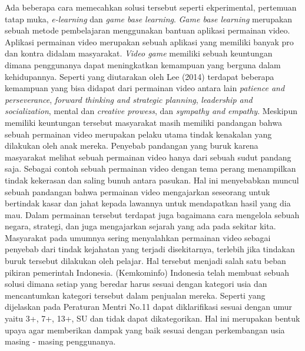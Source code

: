 \linebreak\linebreak
Ada beberapa cara memecahkan solusi tersebut seperti ekperimental, pertemuan tatap muka, \textit{e-learning} dan \textit{game base learning}. \textit{Game base learning} merupakan sebuah metode pembelajaran menggunakan bantuan aplikasi permainan video. Aplikasi permainan video merupakan sebuah aplikasi yang memiliki banyak pro dan kontra didalam masyarakat. \textit{Video game} memiliki sebuah keuntungan dimana penggunanya dapat meningkatkan kemampuan yang berguna dalam kehidupannya. Seperti yang diutarakan oleh Lee (2014) terdapat beberapa kemampuan yang bisa didapat dari permainan video antara lain \textit{patience and perseverance}, \textit{forward thinking and strategic planning}, \textit{leadership and socialization}, mental dan \textit{creative prowess}, dan \textit{sympathy and empathy}. Meskipun memiliki keuntungan tersebut masyarakat masih memiliki pandangan bahwa sebuah permainan video merupakan pelaku utama tindak kenakalan yang dilakukan oleh anak mereka.
\linebreak\linebreak
Penyebab pandangan yang buruk karena masyarakat melihat sebuah permainan video hanya dari sebuah sudut pandang saja. Sebagai contoh sebuah permainan video dengan tema perang menampilkan tindak kekerasan dan saling bunuh antara pasukan. Hal ini menyebabkan muncul sebuah pandangan bahwa permainan video mengajarkan seseorang untuk bertindak kasar dan jahat kepada lawannya untuk mendapatkan hasil yang dia mau. Dalam permainan tersebut terdapat juga bagaimana cara mengelola sebuah negara, strategi, dan juga mengajarkan sejarah yang ada pada sekitar kita. Masyarakat pada umumnya sering menyalahkan permainan video sebagai penyebab dari tindak kejahatan yang terjadi disekitarnya, terlebih jika tindakan buruk tersebut dilakukan oleh pelajar.
\linebreak\linebreak
Hal tersebut menjadi salah satu beban pikiran pemerintah Indonesia. \kemkominfo (Kemkominfo) Indonesia telah membuat sebuah solusi dimana setiap \game yang beredar harus sesuai dengan kategori usia dan mencantumkan kategori tersebut dalam penjualan \game mereka. Seperti yang dijelaskan pada Peraturan Mentri No.11 \game dapat diklarifikasi sesuai dengan umur yaitu 3+, 7+, 13+, SU dan tidak dapat dikategorikan. Hal ini merupakan bentuk upaya agar \game memberikan dampak yang baik sesuai dengan perkembangan usia masing - masing penggunanya.
\linebreak\linebreak
